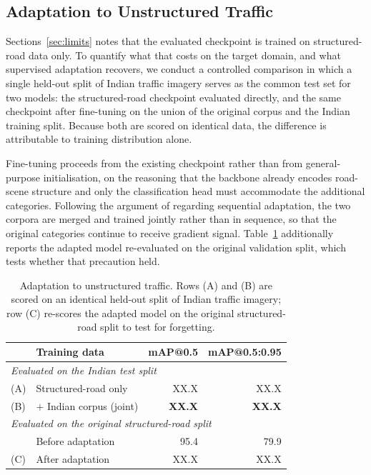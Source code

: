\documentclass[conference]{IEEEtran}
\begin{document}
\subsection{Adaptation to Unstructured Traffic}
\label{sec:india}

Sections~\ref{sec:limits} notes that the evaluated checkpoint is trained on
structured-road data only. To quantify what that costs on the target domain, and
what supervised adaptation recovers, we conduct a controlled comparison in which
a single held-out split of Indian traffic imagery \cite{iisc2025uvh26} serves as
the common test set for two models: the structured-road checkpoint evaluated
directly, and the same checkpoint after fine-tuning on the union of the original
corpus and the Indian training split. Because both are scored on identical data,
the difference is attributable to training distribution alone.

Fine-tuning proceeds from the existing checkpoint rather than from
general-purpose initialisation, on the reasoning that the backbone already
encodes road-scene structure and only the classification head must accommodate
the additional categories. Following the argument of \cite{kumar2025driveindia}
regarding sequential adaptation, the two corpora are merged and trained jointly
rather than in sequence, so that the original categories continue to receive
gradient signal. Table~\ref{tab:india} additionally reports the adapted model
re-evaluated on the original validation split, which tests whether that
precaution held.

\begin{table}[t]
\caption{Adaptation to unstructured traffic. Rows (A) and (B) are scored on an
identical held-out split of Indian traffic imagery; row (C) re-scores the
adapted model on the original structured-road split to test for forgetting.}
\label{tab:india}
\centering
\footnotesize
\begin{tabular}{llrr}
\toprule
 & Training data & mAP@0.5 & mAP@0.5:0.95 \\
\midrule
\multicolumn{4}{l}{\textit{Evaluated on the Indian test split}}\\
(A) & Structured-road only & XX.X & XX.X \\
(B) & \;\;$+$ Indian corpus (joint) & \textbf{XX.X} & \textbf{XX.X} \\
\midrule
\multicolumn{4}{l}{\textit{Evaluated on the original structured-road split}}\\
     & Before adaptation & 95.4 & 79.9 \\
(C) & After adaptation & XX.X & XX.X \\
\bottomrule
\end{tabular}
\end{table}
\end{document}
